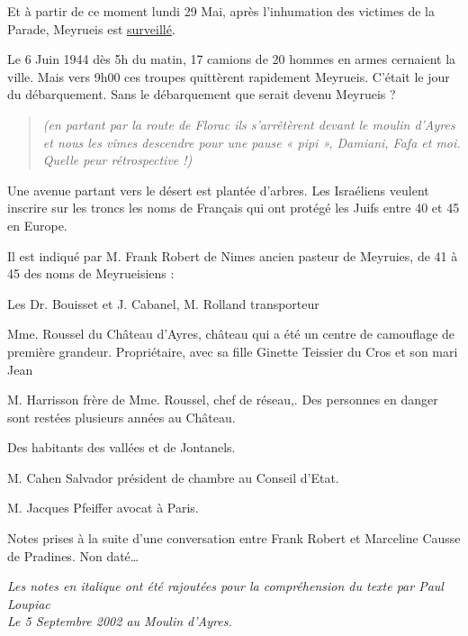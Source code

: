 
Et à partir de ce moment lundi 29 Mai, après l’inhumation des victimes de la Parade,
Meyrueis est \underline{surveillé}.

Le 6 Juin 1944 dès 5h du matin, 17 camions de 20 hommes en armes cernaient la ville. Mais
vers 9h00 ces troupes quittèrent rapidement Meyrueis. C’était le jour du débarquement. Sans
le débarquement que serait devenu Meyrueis ?

\begin{quote}
\textit{(en partant par la route de Florac ils s’arrêtèrent devant le moulin d’Ayres et nous les vîmes
descendre pour une pause « pipi », Damiani, Fafa et moi. Quelle peur rétrospective !)}
\end{quote}

\medskip


\medskip

Une avenue partant vers le désert est plantée d’arbres. Les Israéliens veulent inscrire sur les
troncs les noms de Français qui ont protégé les Juifs entre 40 et 45 en Europe.

\medskip

Il est indiqué par M. Frank Robert de Nimes ancien pasteur de Meyruies, de 41 à 45 des
noms de Meyrueisiens :

Les Dr. Bouisset et J. Cabanel, M. Rolland transporteur

Mme. Roussel du Château d’Ayres, château qui a été un centre de camouflage de première
grandeur. Propriétaire, avec sa fille Ginette Teissier du Cros et son mari Jean

M. Harrisson frère de Mme. Roussel, chef de réseau,. Des personnes en danger sont restées
plusieurs années au Château.

Des habitants des vallées et de Jontanels.

M. Cahen Salvador président de chambre au Conseil d’Etat.

M. Jacques Pfeiffer avocat à Paris.

\medskip

Notes prises à la suite d’une conversation entre Frank Robert et Marceline Causse de
Pradines. Non daté…

\medskip

\textit{Les notes en italique ont été rajoutées pour la compréhension du texte par Paul Loupiac\\
Le 5 Septembre 2002 au Moulin d’Ayres.}
